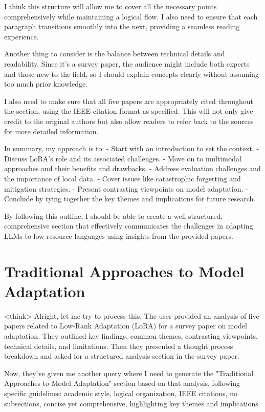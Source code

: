 \documentclass[conference]{IEEEtran}
\begin{document}
I think this structure will allow me to cover all the necessary points comprehensively while maintaining a logical flow. I also need to ensure that each paragraph transitions smoothly into the next, providing a seamless reading experience.

Another thing to consider is the balance between technical details and readability. Since it's a survey paper, the audience might include both experts and those new to the field, so I should explain concepts clearly without assuming too much prior knowledge.

I also need to make sure that all five papers are appropriately cited throughout the section, using the IEEE citation format as specified. This will not only give credit to the original authors but also allow readers to refer back to the sources for more detailed information.

In summary, my approach is to:
- Start with an introduction to set the context.
- Discuss LoRA's role and its associated challenges.
- Move on to multimodal approaches and their benefits and drawbacks.
- Address evaluation challenges and the importance of local data.
- Cover issues like catastrophic forgetting and mitigation strategies.
- Present contrasting viewpoints on model adaptation.
- Conclude by tying together the key themes and implications for future research.

By following this outline, I should be able to create a well-structured, comprehensive section that effectively communicates the challenges in adapting LLMs to low-resource languages using insights from the provided papers.

\section{Traditional Approaches to Model Adaptation}
<think>
Alright, let me try to process this. The user provided an analysis of five papers related to Low-Rank Adaptation (LoRA) for a survey paper on model adaptation. They outlined key findings, common themes, contrasting viewpoints, technical details, and limitations. Then they presented a thought process breakdown and asked for a structured analysis section in the survey paper.

Now, they've given me another query where I need to generate the "Traditional Approaches to Model Adaptation" section based on that analysis, following specific guidelines: academic style, logical organization, IEEE citations, no subsections, concise yet comprehensive, highlighting key themes and implications.
\end{document}
